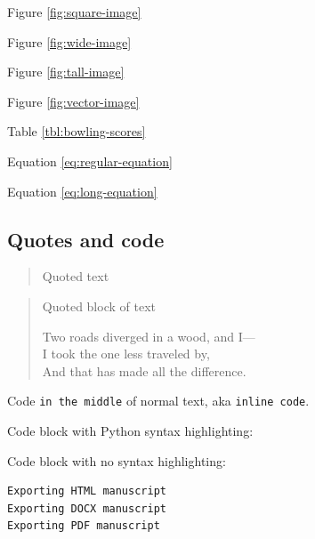 Figure \ref{fig:square-image}

Figure \ref{fig:wide-image}

Figure \ref{fig:tall-image}

Figure \ref{fig:vector-image}

Table \ref{tbl:bowling-scores}

Equation \ref{eq:regular-equation}

Equation \ref{eq:long-equation}

\hypertarget{quotes-and-code}{%
\subsection{Quotes and code}\label{quotes-and-code}}

\begin{quote}
Quoted text
\end{quote}

\begin{quote}
Quoted block of text

Two roads diverged in a wood, and I---\\
I took the one less traveled by,\\
And that has made all the difference.
\end{quote}

Code \texttt{in\ the\ middle} of normal text, aka \texttt{inline\ code}.

Code block with Python syntax highlighting:

\begin{Shaded}
\begin{Highlighting}[]

\OperatorTok{=}\NormalTok{)}
    \OperatorTok{==} 
\end{Highlighting}
\end{Shaded}

Code block with no syntax highlighting:

\begin{verbatim}
Exporting HTML manuscript
Exporting DOCX manuscript
Exporting PDF manuscript
\end{verbatim}

